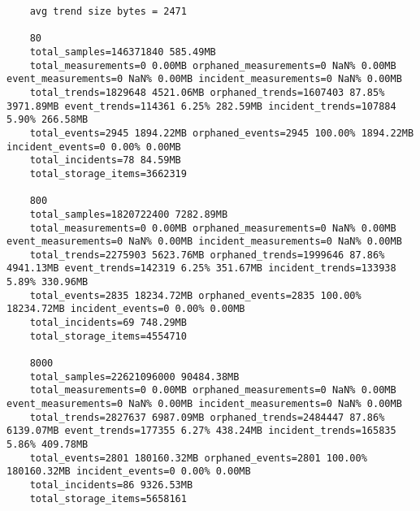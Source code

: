\begin{verbatim}
	avg trend size bytes = 2471

	80
	total_samples=146371840 585.49MB
	total_measurements=0 0.00MB orphaned_measurements=0 NaN% 0.00MB event_measurements=0 NaN% 0.00MB incident_measurements=0 NaN% 0.00MB
	total_trends=1829648 4521.06MB orphaned_trends=1607403 87.85% 3971.89MB event_trends=114361 6.25% 282.59MB incident_trends=107884 5.90% 266.58MB
	total_events=2945 1894.22MB orphaned_events=2945 100.00% 1894.22MB incident_events=0 0.00% 0.00MB
	total_incidents=78 84.59MB
	total_storage_items=3662319

	800
	total_samples=1820722400 7282.89MB
	total_measurements=0 0.00MB orphaned_measurements=0 NaN% 0.00MB event_measurements=0 NaN% 0.00MB incident_measurements=0 NaN% 0.00MB
	total_trends=2275903 5623.76MB orphaned_trends=1999646 87.86% 4941.13MB event_trends=142319 6.25% 351.67MB incident_trends=133938 5.89% 330.96MB
	total_events=2835 18234.72MB orphaned_events=2835 100.00% 18234.72MB incident_events=0 0.00% 0.00MB
	total_incidents=69 748.29MB
	total_storage_items=4554710

	8000
	total_samples=22621096000 90484.38MB
	total_measurements=0 0.00MB orphaned_measurements=0 NaN% 0.00MB event_measurements=0 NaN% 0.00MB incident_measurements=0 NaN% 0.00MB
	total_trends=2827637 6987.09MB orphaned_trends=2484447 87.86% 6139.07MB event_trends=177355 6.27% 438.24MB incident_trends=165835 5.86% 409.78MB
	total_events=2801 180160.32MB orphaned_events=2801 100.00% 180160.32MB incident_events=0 0.00% 0.00MB
	total_incidents=86 9326.53MB
	total_storage_items=5658161

\end{verbatim}
